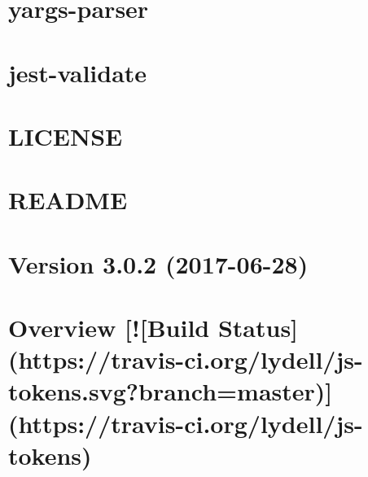 \documentclass[twoside]{book}
\newcommand{\+}{\discretionary{\mbox{\scriptsize$\hookleftarrow$}}{}{}}
\begin{document}
\chapter{yargs-\/parser}
\label{md__c_1_workspace_demo_src_main_script_node_modules_jest-runtime_node_modules_yargs-parser__r_e_a_d_m_e}

\chapter{jest-\/validate}
\label{md__c_1_workspace_demo_src_main_script_node_modules_jest-validate__r_e_a_d_m_e}

\chapter{L\+I\+C\+E\+N\+SE}
\label{md__c_1_workspace_demo_src_main_script_node_modules_js-base64__l_i_c_e_n_s_e}

\chapter{R\+E\+A\+D\+ME}
\label{md__c_1_workspace_demo_src_main_script_node_modules_js-base64__r_e_a_d_m_e}

\chapter{Version 3.0.2 (2017-\/06-\/28)}
\label{md__c_1_workspace_demo_src_main_script_node_modules_js-tokens__c_h_a_n_g_e_l_o_g}

\chapter{Overview \mbox{[}!\mbox{[}Build Status\mbox{]}(https\+://travis-\/ci.org/lydell/js-\/tokens.svg?branch=master)\mbox{]}(https\+://travis-\/ci.org/lydell/js-\/tokens)}
\label{md__c_1_workspace_demo_src_main_script_node_modules_js-tokens__r_e_a_d_m_e}

\end{document}
